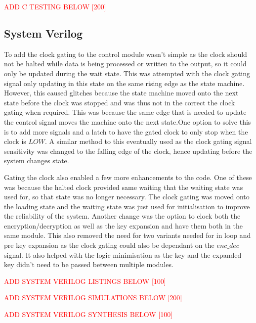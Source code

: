 \documentclass[12pt,twoside,a4paper]{report}
\begin{document}
	\textcolor{red}{ADD C TESTING BELOW [200]}   
    
	\subsection{System Verilog}
	\label{subsection:SV2}
	
	To add the clock gating to the control module wasn't simple as the clock should not be halted while data is being processed or written to the output, so it could only be updated during the wait state. This was attempted with the clock gating signal only updating in this state on the same rising edge as the state machine. However, this caused glitches because the state machine moved onto the next state before the clock was stopped and was thus not in the correct the clock gating when required. This was because the same edge that is needed to update the control signal moves the machine onto the next state.One option to solve this is to add more signals and a latch to have the gated clock to only stop when the clock is $LOW$. A similar method to this eventually used as the clock gating signal sensitivity was changed to the falling edge of the clock, hence updating before the system changes state.
	
	Gating the clock also enabled a few more enhancements to the code. One of these was because the halted clock provided same waiting that the waiting state was used for, so that state was no longer necessary. The clock gating was moved onto the loading state and the waiting state was just used for initialisation to improve the reliability of the system. Another change was the option to clock both the encryption/decryption as well as the key expansion and have them both in the same module. This also removed the need for two variants needed for in loop and pre key expansion as the clock gating could also be dependant on the $enc\_dec$ signal. It also helped with the logic minimisation as the key and the expanded key didn't need to be passed between multiple modules.
    
	\textcolor{red}{ADD SYSTEM VERILOG LISTINGS BELOW [100]}
    
	\textcolor{red}{ADD SYSTEM VERILOG SIMULATIONS BELOW [200]}
    
	\textcolor{red}{ADD SYSTEM VERILOG SYNTHESIS BELOW [100]}
    
\end{document}
